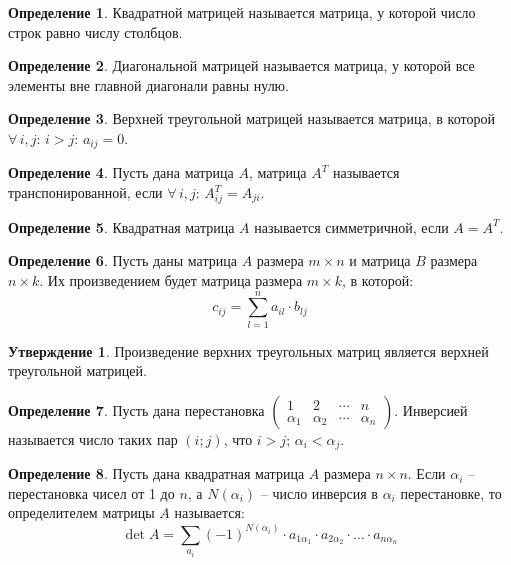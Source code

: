 \documentclass[12pt]{article}
\theoremstyle{definition}
\newtheorem{definition}{Определение}
\newtheorem{statement}[theorem]{Утверждение}
\begin{document}
\begin{definition}
    Квадратной матрицей называется матрица, у которой число строк равно числу столбцов.
\end{definition}
\begin{definition}
    Диагональной матрицей называется матрица, у которой все элементы вне главной диагонали равны нулю.
\end{definition}
\begin{definition}
    Верхней треугольной матрицей называется матрица, в которой $\forall\,i,j:\,i>j:\,a_{ij}=0$.
\end{definition}
\begin{definition}
    Пусть дана матрица $A$, матрица $A^T$ называется транспонированной, если $\forall\,i,j:\,A^T_{ij}=A_{ji}$.
\end{definition}
\begin{definition}
    Квадратная матрица $A$ называется симметричной, если $A=A^T$.
\end{definition}
\begin{definition}
    Пусть даны матрица $A$ размера $m\times n$ и матрица $B$ размера $n\times k$. Их произведением будет матрица размера $m\times k$, в которой:
    $$c_{ij}=\sum_{l=1}^{n}a_{il}\cdot b_{lj}$$
\end{definition}
\begin{statement}
    Произведение верхних треугольных матриц является верхней треугольной матрицей.
\end{statement}
\begin{definition}
    Пусть дана перестановка $\begin{pmatrix}
        1 & 2 & \cdots & n\\
        \alpha_1 & \alpha_2 & \cdots & \alpha_n
    \end{pmatrix}$. Инверсией называется число таких пар $(i;j)$, что $i>j;\,\alpha_i<\alpha_j$.
\end{definition}
\begin{definition}
    Пусть дана квадратная матрица $A$ размера $n\times n$. Если $\alpha_i$ – перестановка чисел от 1 до $n$, а $N(\alpha_i)$ – число инверсия в $\alpha_i$ перестановке, то определителем матрицы $A$ называется:
    $$\det A=\sum_{a_i}(-1)^{N(\alpha_i)}\cdot a_{1\alpha_1}\cdot a_{2\alpha_2}\cdot\ldots\cdot a_{n\alpha_n}$$
\end{definition}
\end{document}
